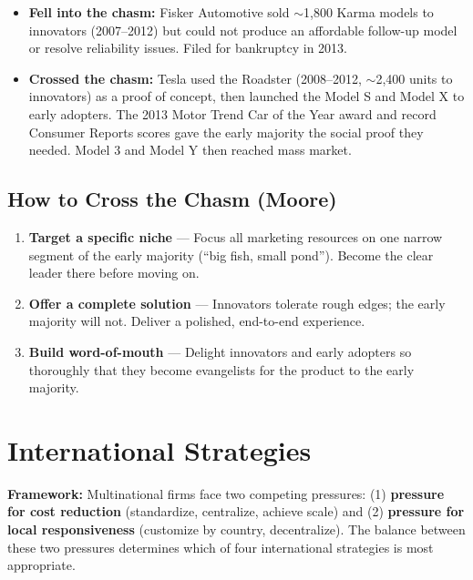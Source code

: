 \documentclass[11pt, letterpaper]{article}
\begin{document}
\begin{itemize}[leftmargin=*]
  \item \textbf{Fell into the chasm:} Fisker Automotive sold $\sim$1,800 Karma models to innovators (2007--2012) but could not produce an affordable follow-up model or resolve reliability issues. Filed for bankruptcy in 2013.
  \item \textbf{Crossed the chasm:} Tesla used the Roadster (2008--2012, $\sim$2,400 units to innovators) as a proof of concept, then launched the Model S and Model X to early adopters. The 2013 Motor Trend Car of the Year award and record Consumer Reports scores gave the early majority the social proof they needed. Model 3 and Model Y then reached mass market.
\end{itemize}

\subsection{How to Cross the Chasm (Moore)}

\begin{enumerate}[leftmargin=*, label=\textbf{\arabic*.}]
  \item \textbf{Target a specific niche} --- Focus all marketing resources on one narrow segment of the early majority (``big fish, small pond''). Become the clear leader there before moving on.
  \item \textbf{Offer a complete solution} --- Innovators tolerate rough edges; the early majority will not. Deliver a polished, end-to-end experience.
  \item \textbf{Build word-of-mouth} --- Delight innovators and early adopters so thoroughly that they become evangelists for the product to the early majority.
\end{enumerate}

\newpage

\section{International Strategies}

\begin{defbox}
\textbf{Framework:} Multinational firms face two competing pressures: (1) \textbf{pressure for cost reduction} (standardize, centralize, achieve scale) and (2) \textbf{pressure for local responsiveness} (customize by country, decentralize). The balance between these two pressures determines which of four international strategies is most appropriate.
\end{defbox}
\end{document}
